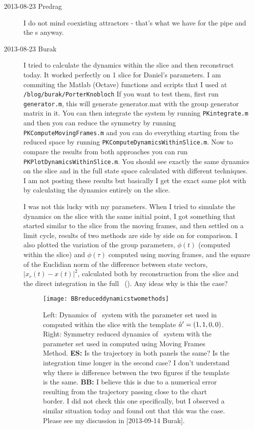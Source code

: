 \begin{description}
\item[2013-08-23 Predrag] I do not mind coexisting attractors - that's what we have
for the pipe and the \pCf s anyway.

\item[2013-08-23 Burak] I tried to calculate the dynamics within the slice and then reconstruct today. It worked perfectly on 1 slice for Daniel's parameters. I am commiting the Matlab (Octave) functions and scripts that I used at
\texttt{/blog/burak/PorterKnobloch}
If you want to test them, first run \texttt{generator.m}, this will generate generator.mat with the group generator matrix in it. You can then integrate the system by running \texttt{PKintegrate.m} and then you can reduce the symmetry by running \texttt{PKComputeMovingFrames.m} and you can do everything starting from the reduced space by running \texttt{PKComputeDynamicsWithinSlice.m}. Now to compare the results from both approaches you can run \texttt{PKPlotDynamicsWithinSlice.m}. You should see exactly the same dynamics on the slice and in the full state space calculated with different techniques. I am not posting these results but basically I get the exact same plot with  by calculating the dynamics entirely on the slice.

I was not this lucky with my parameters. When I tried to simulate the dynamics on the slice with the same initial point, I got something that started similar to the slice from the moving frames, and then settled on a limit cycle, results of two methods are side by side on  for comparison. I also plotted the variation of the group parameters, $\phi(t)$ (computed within the slice) and $\phi(\tau)$ computed using moving frames, and the square of the Euclidian norm of the difference between state vectors, $|x_r(t)-x(t)|^2$, calculated both by reconstruction from the slice and the direct integration in the full \statesp\ (). Any ideas why is this the case?

\begin{figure}%
  \begin{center}
  \texttt{[image: BBreduceddynamicstwomethods]}
  \end{center}
  \caption{Left: Dynamics of \twomode\ system with the parameter set used
    in  computed within the slice with
    the template ${\hat{a}'} = (1,1,0,0)$. Right: Symmetry reduced dynamics
    of \twomode\ system with the parameter set
    used in 
    computed using Moving Frames Method. \textbf{ES:} Is the trajectory
    in both panels the same? Is the integration time longer in the second case?
    I don't understand why there is difference between the two figures if the
    template is the same. \textbf{BB:} I believe this is due to a numerical error resulting from the trajectory passing close to the chart border. I did not check this one specifically, but I observed a similar situation today and found out that this was the case. Please see my discussion in [2013-09-14 Burak].
     }
  \label{fig:BBreduceddynamicstwomethods}
\end{figure}


\end{description}
